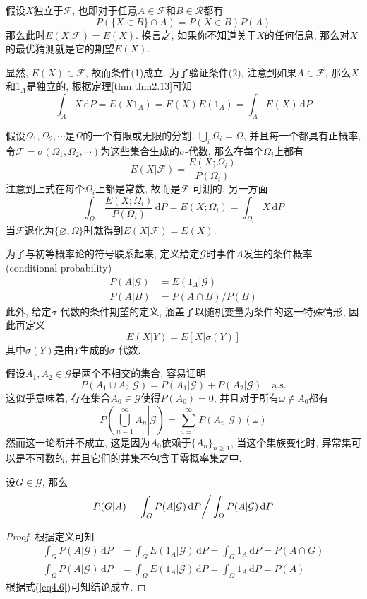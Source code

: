 \documentclass[cn, 12pt, math=mtpro2, bibstyle=apa, blue, twocol]{elegantbook}
\newcommand{\F}{\mathcal{F}}
\newcommand{\G}{\mathcal{G}}
\let\emptyset\varnothing
\begin{document}
\begin{example}
假设$X$独立于$\F$, 也即对于任意$A\in\F$和$B\in\mathcal{R}$都有
$$P(\{X\in B\}\cap A)=P(X\in B)P(A)$$
那么此时$E(X|\F)=E(X)$. 换言之, 如果你不知道关于$X$的任何信息, 那么对$X$的最优猜测就是它的期望$E(X)$.

显然, $E(X)\in\F$, 故而条件(1)成立. 为了验证条件(2), 注意到如果$A\in\F$, 那么$X$和$1_A$是独立的, 根据定理\ref{thm:thm2.13}可知
$$\int_AX\,\text{d}P=E(X1_A)=E(X)E(1_A)=\int_AE(X)\,\text{d}P$$
\end{example}

\begin{example}
假设$\Omega_1,\Omega_2,\cdots$是$\Omega$的一个有限或无限的分割, $\bigcup_i\Omega_i=\Omega$, 并且每一个都具有正概率, 令$\F=\sigma(\Omega_1,\Omega_2,\cdots)$为这些集合生成的$\sigma$-代数, 那么在每个$\Omega_i$上都有
$$E(X|\F)=\frac{E(X;\Omega_i)}{P(\Omega_i)}$$
注意到上式在每个$\Omega_i$上都是常数, 故而是$\F$-可测的, 另一方面
$$\int_{\Omega_i}\frac{E(X;\Omega_i)}{P(\Omega_i)}\,\text{d}P=E(X;\Omega_i)=\int_{\Omega_i}X\,\text{d}P$$
当$\F$退化为$\{\emptyset,\Omega\}$时就得到$E(X|\F)=E(X)$.
\end{example}

为了与初等概率论的符号联系起来, 定义给定$\G$时事件$A$发生的条件概率 (conditional probability)
\begin{align}
P(A|\mathcal{G})&=E(1_A|\mathcal{G}) \nonumber \\
P(A|B)&=P(A\cap B)/P(B) \label{eq4.6}
\end{align}
此外, 给定$\sigma$-代数的条件期望的定义, 涵盖了以随机变量为条件的这一特殊情形, 因此再定义
$$E(X|Y)=E[X|\sigma(Y)]$$
其中$\sigma(Y)$是由$Y$生成的$\sigma$-代数.

假设$A_1, A_2\in\G$是两个不相交的集合, 容易证明
$$P(A_1\cup A_2|\G)=P(A_1|\G)+P(A_2|\G)\quad \text{a.s.}$$
这似乎意味着, 存在集合$A_0\in\G$使得$P(A_0)=0$, 并且对于所有$\omega\notin A_0$都有
$$P\left(\left.\bigcup_{n=1}^\infty A_n\right|\G\right)=\sum_{n=1}^{\infty}P(A_n|\G)(\omega)$$
然而这一论断并不成立, 这是因为$A_0$依赖于$\{A_n\}_{n\ge1}$, 当这个集族变化时, 异常集可以是不可数的, 并且它们的并集不包含于零概率集之中.

\begin{example}[$\,$Bayes公式]
设$G\in\G$, 那么
$$P(G|A)=\left.\int_GP(A|\G)\,\text{d}P\right/\int_\Omega P(A|\G)\,\text{d}P$$
\end{example}
\begin{proof}
  根据定义可知
  \begin{align*}
  \int_GP(A|\G)\,\text{d}P&=\int_GE(1_A|\G)\,\text{d}P=\int_G1_A\,\text{d}P=P(A\cap G) \\
  \int_\Omega P(A|\G)\,\text{d}P&=\int_\Omega E(1_A|\G)\,\text{d}P=\int_\Omega1_A\,\text{d}P=P(A)
  \end{align*}
  根据式(\ref{eq4.6})可知结论成立.
\end{proof}
\end{document}
